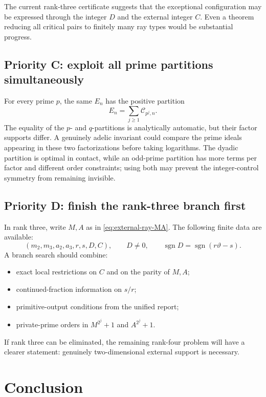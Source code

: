 \documentclass[11pt]{article}
\theoremstyle{definition}
\newcommand{\vtheta}{\vartheta}
\begin{document}
The current rank-three certificate suggests that the exceptional configuration may be
expressed through the integer $D$ and the external integer $C$.  Even a theorem reducing
all critical pairs to finitely many ray types would be substantial progress.

\subsection{Priority C: exploit all prime partitions simultaneously}

For every prime $p$, the same $E_n$ has the positive partition
\[
 E_n=\sum_{j\ge1}\mathcal C_{p^j,n}.
\]
The equality of the $p$- and $q$-partitions is analytically automatic, but their factor
supports differ.  A genuinely adelic invariant could compare the prime ideals appearing
in these two factorizations before taking logarithms.  The dyadic partition is optimal in
contact, while an odd-prime partition has more terms per factor and different order
constraints; using both may prevent the integer-control symmetry from remaining invisible.

\subsection{Priority D: finish the rank-three branch first}

In rank three, write $M,A$ as in \eqref{eq:external-ray-MA}.  The following finite data are
available:
\begin{equation}\label{eq:rank-three-data}
 (m_2,m_3,a_2,a_3,r,s,D,C),
 \qquad D\ne0,
 \qquad \operatorname{sgn}D=\operatorname{sgn}(r\vtheta-s).
\end{equation}
A branch search should combine:
\begin{itemize}
\item exact local restrictions on $C$ and on the parity of $M,A$;
\item continued-fraction information on $s/r$;
\item primitive-output conditions from the unified report;
\item private-prime orders in $M^{2^j}+1$ and $A^{2^j}+1$.
\end{itemize}
If rank three can be eliminated, the remaining rank-four problem will have a clearer
statement: genuinely two-dimensional external support is necessary.

\section{Conclusion}
\end{document}
